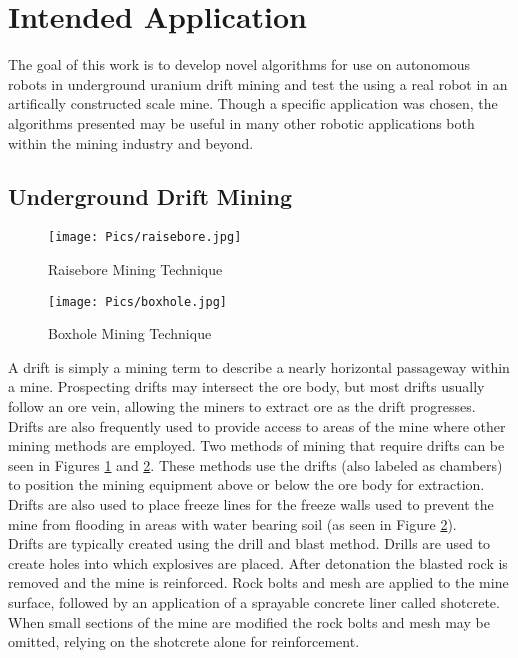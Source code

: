 \section{Intended Application}
\label{sec:prob}
The goal of this work is to develop novel algorithms for use on autonomous robots in underground uranium drift mining and test the using a real robot in an artifically constructed scale mine. Though a specific application was chosen, the algorithms presented may be useful in many other robotic applications both within the mining industry and beyond.\\

\subsection{Underground Drift Mining}

\begin{figure}
    \centering
    \texttt{[image: Pics/raisebore.jpg]}
    \caption{Raisebore Mining Technique \cite{weblink}}
    \label{fig:raisebore}
\end{figure}
\begin{figure}
    \centering
    \texttt{[image: Pics/boxhole.jpg]}
    \caption{Boxhole Mining Technique \cite{weblink}}
    \label{fig:boxhole}
\end{figure}
A drift is simply a mining term to describe a nearly horizontal passageway within a mine. Prospecting drifts may intersect the ore body, but most drifts usually follow an ore vein, allowing the miners to extract ore as the drift progresses. Drifts are also frequently used to provide access to areas of the mine where other mining methods are employed. Two methods of mining that require drifts can be seen in Figures \ref{fig:raisebore} and \ref{fig:boxhole}. These methods use the drifts (also labeled as chambers) to position the mining equipment above or below the ore body for extraction. Drifts are also used to place freeze lines for the freeze walls used to prevent the mine from flooding in areas with water bearing soil (as seen in Figure \ref{fig:boxhole}).\\

Drifts are typically created using the drill and blast method. Drills are used to create holes into which explosives are placed. After detonation the blasted rock is removed and the mine is reinforced. Rock bolts and mesh are applied to the mine surface, followed by an application of a sprayable concrete liner called shotcrete. When small sections of the mine are modified the rock bolts and mesh may be omitted, relying on the shotcrete alone for reinforcement.\\

